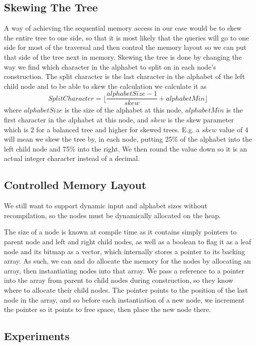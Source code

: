 \subsection{Skewing The Tree}
\label{sec:SkewingTheTree}
A way of achieving the sequential memory access in our case would be to skew the entire tree to one side, so that it is most likely that the queries will go to one side for most of the traversal and then control the memory layout so we can put that side of the tree next in memory.
Skewing the tree is done by changing the way we find which character in the alphabet to split on in each node's construction.
The split character is the last character in the alphabet of the left child node and to be able to skew the calculation we calculate it as
\[SplitCharacter = \lfloor \frac{alphabetSize-1}{skew} + alphabetMin \rfloor \]
where $alphabetSize$ is the size of the alphabet at this node, $alphabetMin$ is the first character in the alphabet at this node, and $skew$ is the skew parameter which is 2 for a balanced tree and higher for skewed trees. E.g. a $skew$ value of 4 will mean we skew the tree by, in each node, putting 25\% of the alphabet into the left child node and 75\% into the right.
We then round the value down so it is an actual integer character instead of a decimal.


\subsection{Controlled Memory Layout}
We still want to support dynamic input and alphabet sizes without recompilation, so the nodes must be dynamically allocated on the heap.

The size of a node is known at compile time as it contains simply pointers to parent node and left and right child nodes, as well as a boolean to flag it as a leaf node and its bitmap as a vector, which internally stores a pointer to its backing array.
As such, we can and do allocate the memory for the nodes by allocating an array, then instantiating nodes into that array.
We pass a reference to a pointer into the array from parent to child nodes during construction, so they know where to allocate their child nodes.
The pointer points to the position of the last node in the array, and so before each instantiation of a new node, we increment the pointer so it points to free space, then place the new node there.



\subsection{Experiments}

